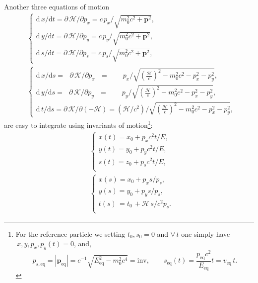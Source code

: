 \documentclass[]{article}
\begin{document}
Another three equations of motion
\begin{subequations}
\begin{align}
&\left\{\begin{array}{rcr}
\mathrm{d}\,x/\mathrm{d}t = \partial\,\mathcal{H}/\partial p_x =
c\,p_x/\sqrt{ m_0^2c^2 + \mathbf{p}^2 },								\\
\mathrm{d}\,y/\mathrm{d}t = \partial\,\mathcal{H}/\partial p_y =
c\,p_y/\sqrt{ m_0^2c^2 + \mathbf{p}^2 },								\\
\mathrm{d}\,s/\mathrm{d}t = \partial\,\mathcal{H}/\partial p_s =
c\,p_s/\sqrt{ m_0^2c^2 + \mathbf{p}^2 },
\end{array}\right.								\\
&\left\{\begin{array}{rcr}
\mathrm{d}\,x/\mathrm{d}s = \,\,\,\, \partial\,\mathcal{K}/\partial p_x\,\,\,\,=
\qquad p_x/\sqrt{ \left(\frac{\mathcal{H}}{c}\right)^2 - m_0^2c^2 - p_x^2 - p_y^2 },	\\
\mathrm{d}\,y/\mathrm{d}s = \,\,\,\, \partial\,\mathcal{K}/\partial p_y\,\,\,\,=
\qquad p_y/\sqrt{ \left(\frac{\mathcal{H}}{c}\right)^2 - m_0^2c^2 - p_x^2 - p_y^2 },	\\
\mathrm{d}\,t/\mathrm{d}s = \partial\,\mathcal{K}/\partial (-\mathcal{H}) =
(\mathcal{H}/c^2)/\sqrt{ \left(\frac{\mathcal{H}}{c}\right)^2 - m_0^2c^2 - p_x^2 - p_y^2 },
\end{array}\right.
\end{align}
\end{subequations}
are easy to integrate using invariants of motion\footnote{
For the reference particle we setting $t_0,s_0=0$ and $\forall\,t$ one simply have
$\,x,y,p_x,p_y(t)=0$, and,
\[
	p_{s,\text{eq}} = |\mathbf{p}_{\text{eq}}| =
		c^{-1}\sqrt{E_{\text{eq}}^2 - m_0^2c^4}  = \text{inv},\qquad
	s_{\text{eq}}(t) = \frac{p_{\text{eq}} c^2}{E_{\text{eq}}}t =
		v_{\text{eq}}\,t.
\]
}:
\begin{subequations}
\begin{align}
&\left\{\begin{array}{c}
x(t) = x_0 + p_x c^2 t/ E,				\\
y(t) = y_0 + p_y c^2 t/ E,				\\
s(t) = z_0 + p_s c^2 t/ E,				\\
\end{array}\right.								\\
&\left\{\begin{array}{l}
x(s) = x_0 + p_x		s / p_s,		\\
y(s) = y_0 + p_y		s / p_s,		\\
t(s)\, = t_0 \,+ \mathcal{H}\,s / c^2 p_s.	\\
\end{array}\right.
\end{align}
\end{subequations}
\end{document}
